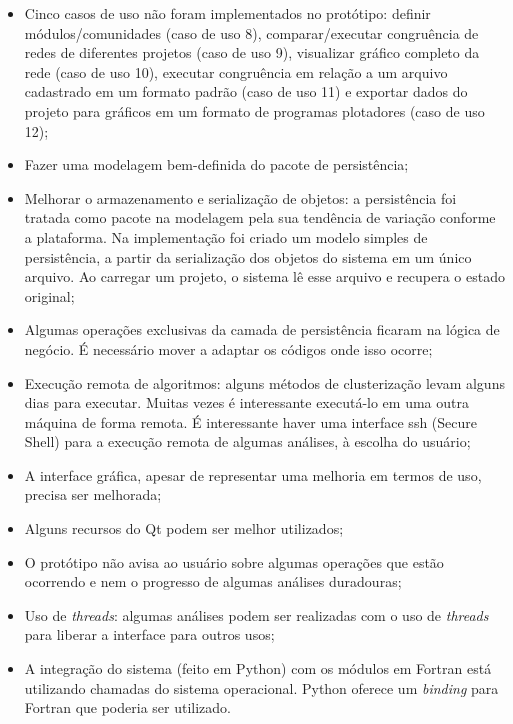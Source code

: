 \begin{itemize}
  \item{Cinco casos de uso não foram implementados no protótipo: definir módulos/comunidades (caso de uso 8), comparar/executar congruência de redes de
diferentes projetos (caso de uso 9), visualizar gráfico completo da rede (caso de uso 10), executar congruência em relação a um arquivo cadastrado em um
formato padrão (caso de uso 11) e exportar dados do projeto para gráficos em um formato de programas plotadores (caso de uso 12);}
  \item{Fazer uma modelagem bem-definida do pacote de persistência;}
  \item{Melhorar o armazenamento e serialização de objetos: a persistência foi tratada como pacote na modelagem pela sua tendência de variação conforme
a plataforma. Na implementação foi criado um modelo simples de persistência, a partir da serialização dos objetos do sistema em um único arquivo. Ao
carregar um projeto, o sistema lê esse arquivo e recupera o estado original;}
  \item{Algumas operações exclusivas da camada de persistência ficaram na lógica de negócio. É necessário mover a adaptar os códigos onde isso ocorre;}
  \item{Execução remota de algoritmos: alguns métodos de clusterização levam alguns dias para executar. Muitas vezes é interessante executá-lo em uma outra
máquina de forma remota. É interessante haver uma interface ssh (Secure Shell) para a execução remota de algumas análises, à escolha do usuário;}
  \item{A interface gráfica, apesar de representar uma melhoria em termos de uso, precisa ser melhorada;}
  \item{Alguns recursos do Qt podem ser melhor utilizados;}
  \item{O protótipo não avisa ao usuário sobre algumas operações que estão ocorrendo e nem o progresso de algumas análises duradouras;}
  \item{Uso de \textit{threads}: algumas análises podem ser realizadas com o uso de \textit{threads} para liberar a interface para outros usos;}
  \item{A integração do sistema (feito em Python) com os módulos em Fortran está utilizando chamadas do sistema operacional. Python oferece um
\textit{binding} para Fortran que poderia ser utilizado.}
\end{itemize}

